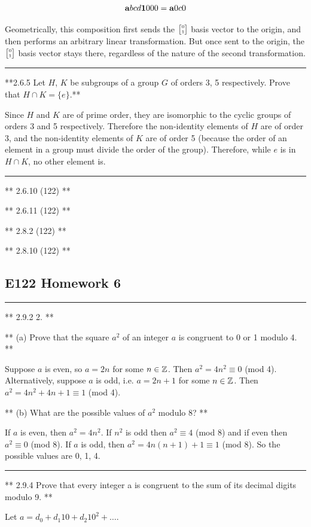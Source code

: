 $$
\tiny{\mathbf{a}{b}{c}{d}} \tiny{\mathbf{1}{0}{0}{0}} = \tiny{\mathbf{a}{0}{c}{0}}
$$

Geometrically, this composition first sends the $\tiny{\begin{bmatrix}0\\1\end{bmatrix}}$ basis vector to
the origin, and then performs an arbitrary linear transformation. But once sent
to the origin, the $\tiny{\begin{bmatrix}0\\1\end{bmatrix}}$ basis vector stays there, regardless of the
nature of the second transformation.

\hrule

**2.6.5 Let $H$, $K$ be subgroups of a group $G$ of orders 3, 5
  respectively. Prove that $H \cap K = \{e\}$.**

Since $H$ and $K$ are of prime order, they are isomorphic to the cyclic groups
of orders 3 and 5 respectively. Therefore the non-identity elements of $H$ are
of order 3, and the non-identity elements of $K$ are of order 5 (because the
order of an element in a group must divide the order of the group). Therefore,
while $e$ is in $H \cap K$, no other element is.

\hrule


** 2.6.10 (122) **

** 2.6.11 (122) **

** 2.8.2 (122) **

** 2.8.10 (122) **


\subsection{E122 Homework 6}

\hrule
** 2.9.2 2. **

** (a) Prove that the square $a^2$ of an integer $a$ is congruent to 0 or 1 modulo 4. **

Suppose $a$ is even, so $a = 2n$ for some $n \in \mathbb{Z}$. Then $a^2 = 4n^2 \equiv
0$ (mod 4). Alternatively, suppose $a$ is odd, i.e. $a = 2n + 1$ for some $n
\in \mathbb{Z}$. Then $a^2 = 4n^2 + 4n +1 \equiv 1$ (mod 4).

** (b) What are the possible values of $a^2$ modulo 8? **

If $a$ is even, then $a^2 = 4n^2$. If $n^2$ is odd then $a^2 \equiv 4$ (mod 8)
and if even then $a^2 \equiv 0$ (mod 8). If $a$ is odd, then $a^2 = 4n(n+1) + 1
\equiv 1$ (mod 8). So the possible values are 0, 1, 4.


\hrule

** 2.9.4 Prove that every integer a is congruent to the sum of its decimal
digits modulo 9. **

Let $a = d_0 + d_1 10 + d_2 10^2 + \ldots$.


